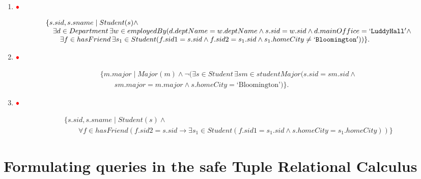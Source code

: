 \documentclass{article}
\newcommand{\red}[1]{{\color{red}#1}}
\newcommand{\redbullet}{$\red{\bullet}$}
\begin{document}
\begin{enumerate}[resume]
\item  \redbullet\ 

{\tiny
\[
\begin{array}{ll}
\{s.sid, s.sname\mid Student(s) \land \\
\quad \exists d\in Department\, \exists w\in employedBy (d.deptName = w.deptName \land s.sid = w.sid \land d.mainOffice = \mathtt{`LuddyHall'} \land \\
\quad \quad \exists f\in hasFriend\, \exists s_1\in Student (f.sid1 = s.sid \land f.sid2 = s_1.sid \land s_1.homeCity \neq \mathtt{`Bloomington'}))\}.
\end{array}
\]
}

\item  \redbullet\ 

{\small
\[
\begin{array}{ll}
\{m.major\mid Major(m) \land \lnot (\exists s\in Student\, \exists sm\in studentMajor (s.sid = sm.sid\land \\
\qquad sm.major = m.major \land s.homeCity = \mbox{`Bloomington'})\}.
\end{array}
\]
}

\item  \redbullet\ 

{\small
\[
\begin{array}{ll}
\{s.sid, s.sname\mid Student(s) \land \\
\qquad \forall f\in hasFriend(f.sid2 = s.sid \rightarrow 
\exists s_1\in Student (f.sid1 = s_1.sid \land s.homeCity = s_1.homeCity))\}
\end{array}
\]
}

\end{enumerate}
\newpage
\section{Formulating queries in the safe Tuple Relational Calculus}
\end{document}
